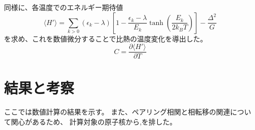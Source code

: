 \documentclass[a4paper]{jsreport}
\begin{document}
  同様に、各温度でのエネルギー期待値  
  \begin{equation}
      \langle H' \rangle = \sum_{k>0} (\epsilon_k - \lambda) \left[ 1 - \frac{\epsilon_k - \lambda}{E_k} \tanh \left( \frac{E_k}{2k_B T} \right) \right] - \frac{\Delta^2}{G}
  \end{equation}
  を求め、これを数値微分することで比熱の温度変化を導出した。  
  \begin{equation}
      C = \frac{\partial \langle H' \rangle}{\partial T}
  \end{equation}

\chapter{結果と考察}
  ここでは数値計算の結果を示す。
  また、ペアリング相関と相転移の関連について関心があるため、
  計算対象の原子核から,を排した。
\end{document}
